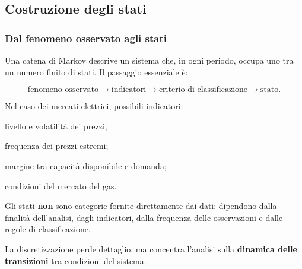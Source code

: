 \subsection{Costruzione degli stati}%

\begin{frame}%
%

\frametitle{Dal fenomeno osservato agli stati}%
%

%


Una catena di Markov descrive un sistema che, in ogni periodo, occupa uno tra
un numero finito di stati. Il passaggio essenziale \`{e}:%

\[
\text{fenomeno osservato} \longrightarrow\text{indicatori} \longrightarrow
\text{criterio di classificazione} \longrightarrow\text{stato}.
\]


\medskip

Nel caso dei mercati elettrici, possibili indicatori:

\begin{stepitemize}


\item livello e volatilit\`{a} dei prezzi;

\item frequenza dei prezzi estremi;

\item margine tra capacit\`{a} disponibile e domanda;

\item condizioni del mercato del gas.
\end{stepitemize}

\medskip

\begin{stepitemize}
\item Gli stati \textbf{non} sono categorie fornite direttamente dai dati:
dipendono dalla finalit\`{a} dell'analisi, dagli indicatori, dalla frequenza
delle osservazioni e dalle regole di classificazione.

\item La discretizzazione perde dettaglio, ma concentra l'analisi sulla
\textbf{dinamica delle transizioni} tra condizioni del sistema.
\end{stepitemize}

%

\transboxout
\end{frame}%


